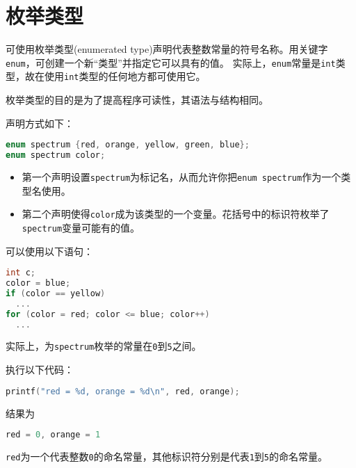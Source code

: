 \section{枚举类型}

\begin{frame}[fragile]\ft{\secname}
  可使用枚举类型(enumerated type)声明代表整数常量的符号名称。用关键字\verb|enum|，可创建一个新“类型”并指定它可以具有的值。
实际上，\verb|enum|常量是\verb|int|类型，故在使用\verb|int|类型的任何地方都可使用它。\vspace{0.1in}

枚举类型的目的是为了提高程序可读性，其语法与结构相同。
\end{frame}

\begin{frame}[fragile]\ft{\secname}
  声明方式如下：
  \begin{lstlisting}[language=c,backgroundcolor=\color{red!20}]
enum spectrum {red, orange, yellow, green, blue};
enum spectrum color;
  \end{lstlisting}
  \begin{itemize}
  \item 第一个声明设置\verb|spectrum|为标记名，从而允许你把\verb|enum spectrum|作为一个类型名使用。\\[0.1in]
  \item 第二个声明使得\verb|color|成为该类型的一个变量。花括号中的标识符枚举了\verb|spectrum|变量可能有的值。
  \end{itemize}
\end{frame}

\begin{frame}[fragile]\ft{\secname}
可以使用以下语句：
  \begin{lstlisting}[language=c,backgroundcolor=\color{red!20}]
int c;
color = blue;
if (color == yellow)
  ...
for (color = red; color <= blue; color++)
  ...
  \end{lstlisting}
实际上，为\verb|spectrum|枚举的常量在\verb|0|到\verb|5|之间。
\end{frame}

\begin{frame}[fragile]\ft{\secname}
执行以下代码：
  \begin{lstlisting}[language=c,backgroundcolor=\color{red!20}]
printf("red = %d, orange = %d\n", red, orange);
  \end{lstlisting}
结果为
  \begin{lstlisting}[language=c,backgroundcolor=\color{red!20}]
red = 0, orange = 1
  \end{lstlisting}
\verb|red|为一个代表整数\verb|0|的命名常量，其他标识符分别是代表\verb|1|到\verb|5|的命名常量。
\end{frame}

